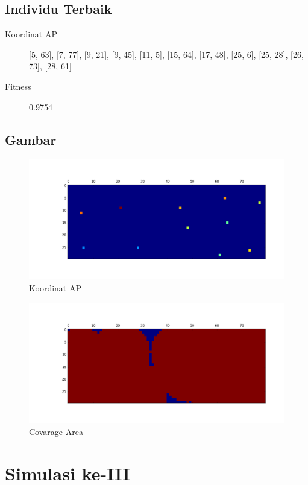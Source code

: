 \documentclass[11pt,a4paper,titlepage]{report}
\begin{document}
	\subsection*{Individu Terbaik}
	\begin{description}
		\item[Koordinat AP] [5, 63], [7, 77], [9, 21], [9, 45], [11, 5], [15, 64], [17, 48], [25, 6], [25, 28], [26, 73], [28, 61]
		\item[Fitness] 0.9754
	\end{description}
	\newpage
	\subsection*{Gambar}
	\begin{figure}[h]
		\centering
		\includegraphics[width=0.9\linewidth]{apLoc_02}
		\caption{Koordinat AP}
		\label{fig:apLoc_02}
	\end{figure}
	\begin{figure}[h]
		\centering
		\includegraphics[width=0.9\linewidth]{coverage_02}
		\caption{Covarage Area}
		\label{fig:coverage_02}
	\end{figure}
	\newpage
	\section*{Simulasi ke-III}
\end{document}
